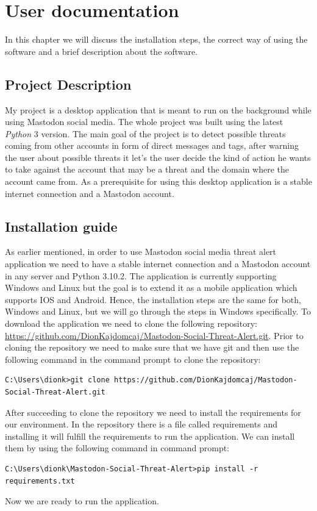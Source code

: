 \chapter{User documentation}
\label{ch:user}

In this chapter we will discuss the installation steps,
the correct way of using the software and a brief description
about the software.


\section{Project Description}
\label{s:project_desc}

My project is a desktop application that is meant to run 
on the background while using Mastodon social media. The
whole project was built using the latest \textit{Python} 3 version.
The main goal of the project is to detect possible
threats coming from other accounts in form of direct
messages and tags, after warning the user about possible 
threats it let's the user decide the kind of action
he wants to take against the account that may be a threat
and the domain where the account came from.
\newline
As a prerequisite for using this desktop application is
a stable internet connection and a Mastodon account.


\section{Installation guide}
\label{s:installation_guide}
As earlier mentioned, in order to use Mastodon social media threat alert application
we need to have a stable internet connection and a Mastodon account in any server and Python 3.10.2.
\newline
The application is currently supporting Windows and Linux but the goal is to extend it as a 
mobile application which supports IOS and Android. Hence, the installation steps are the same for
both, Windows and Linux, but we will go through the steps in Windows specifically.
\newline
To download the application we need to clone the following repository: 
\url{https://github.com/DionKajdomcaj/Mastodon-Social-Threat-Alert.git}.
\newline
Prior to cloning the repository we need to make sure that we have git and then use
the following command in the command prompt to clone the repository:
\begin{lstlisting}[caption=Cloning Repository, captionpos=b]
	C:\Users\dionk>git clone https://github.com/DionKajdomcaj/Mastodon-Social-Threat-Alert.git
\end{lstlisting}
After succeeding to clone the repository we need to install the requirements for
our environment. In the repository there is a file called requirements and installing it
will fulfill the requirements to run the application. We can install them by
using the following command in command prompt:
\begin{lstlisting}[caption=Installing requirements, captionpos=b]
	C:\Users\dionk\Mastodon-Social-Threat-Alert>pip install -r requirements.txt
\end{lstlisting}
Now we are ready to run the application.


